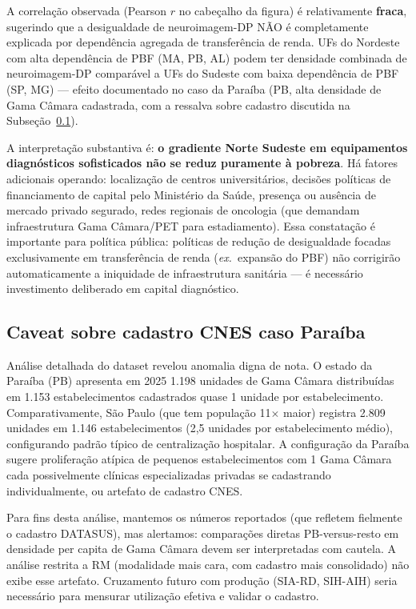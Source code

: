 \documentclass[12pt,a4paper,oneside]{article}
\begin{document}
A correlação observada (Pearson $r$ no cabeçalho da figura) é
relativamente \textbf{fraca}, sugerindo que a desigualdade de
neuroimagem-DP NÃO é completamente explicada por dependência
agregada de transferência de renda. UFs do Nordeste com alta
dependência de PBF (MA, PB, AL) podem ter densidade combinada de
neuroimagem-DP comparável a UFs do Sudeste com baixa dependência
de PBF (SP, MG) — efeito documentado no caso da Paraíba (PB, alta
densidade de Gama Câmara cadastrada, com a ressalva sobre cadastro
discutida na Subseção~\ref{subsec:caveats}).

A interpretação substantiva é: \textbf{o gradiente Norte\textendash
Sudeste em equipamentos diagnósticos sofisticados não se reduz
puramente à pobreza}. Há fatores adicionais operando: localização
de centros universitários, decisões políticas de financiamento de
capital pelo Ministério da Saúde, presença ou ausência de mercado
privado segurado, redes regionais de oncologia (que demandam
infraestrutura Gama Câmara/PET para estadiamento). Essa
constatação é importante para política pública: políticas de
redução de desigualdade focadas exclusivamente em transferência de
renda (\textit{ex.}\ expansão do PBF) não corrigirão automaticamente
a iniquidade de infraestrutura sanitária — é necessário investimento
deliberado em capital diagnóstico.

\subsection{Caveat sobre cadastro CNES \textendash{} caso Paraíba}\label{subsec:caveats}

Análise detalhada do dataset revelou anomalia digna de nota. O
estado da Paraíba (PB) apresenta em 2025 1.198 unidades de Gama
Câmara distribuídas em 1.153 estabelecimentos cadastrados \textemdash{}
quase 1 unidade por estabelecimento. Comparativamente, São Paulo
(que tem população 11$\times$ maior) registra 2.809 unidades em
1.146 estabelecimentos (2,5 unidades por estabelecimento médio),
configurando padrão típico de centralização hospitalar. A
configuração da Paraíba sugere proliferação atípica de pequenos
estabelecimentos com 1 Gama Câmara cada \textemdash{} possivelmente
clínicas especializadas privadas se cadastrando individualmente, ou
artefato de cadastro CNES.

Para fins desta análise, mantemos os números reportados (que
refletem fielmente o cadastro DATASUS), mas alertamos: comparações
diretas PB-versus-resto em densidade per capita de Gama Câmara devem
ser interpretadas com cautela. A análise restrita a RM (modalidade
mais cara, com cadastro mais consolidado) não exibe esse
artefato. Cruzamento futuro com produção (SIA-RD, SIH-AIH) seria
necessário para mensurar utilização efetiva e validar o cadastro.
\end{document}
